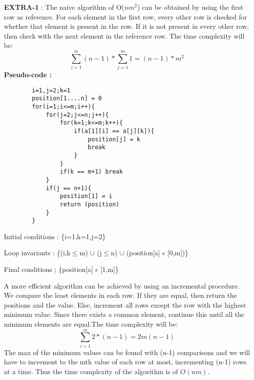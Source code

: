 \documentclass[12pt]{article}
\begin{document}
\begin{enumerate}
    \textbf{EXTRA-1} : 
    The naive algorithm of O($nm^2$) can be obtained by using the first row as reference. For each element in the first row, every other row is checked for whether that element is present in the row. If it is not present in every other row, then check with the next element in the reference row.
    The time complexity will be:
    \[\sum_{i=1}^{m}(n-1)*\sum_{j=1}^{m}1 = (n-1)*m^2 \]
    \textbf{Pseudo-code :}
    \begin{verbatim}
        i=1,j=2;k=1
        position[1....n] = 0
        for(i=1;i<=m;i++){
            for(j=2;j<=n;j++){
                for(k=1;k<=m;k++){
                    if(a[1][i] == a[j][k]){
                        position[j] = k
                        break
                    }
                }
                if(k == m+1) break
            }
            if(j == n+1){
                position[1] = i
                return (position)
            }
        }
    \end{verbatim}
    Initial conditions : \{i=1,k=1,j=2\}
    
    Loop invariants : \{(i,k$\leq$m) $\cup$ (j$\leq$n) $\cup$ (position[a] $\epsilon$ [0,m])\}
    
    Final conditions ; \{position[a] $\epsilon$ [1,m]\}
    
    A more efficient algorithm can be achieved by using an incremental procedure. We compare the least elements in each row. If they are equal, then return the positions and the value. Else, increment all rows except the row with the highest minimum value. Since there exists a common element, continue this until all the minimum elements are equal.The time complexity will be: 
    \[\sum_{i=1}^{m}2*(n-1) = 2m(n-1)\]
    The max of the minimum values can be found with (n-1) comparisons and we will have to increment to the mth value of each row at most, incrementing (n-1) rows at a time. Thus the time complexity of the algorithm is of $O(nm)$.
    

\end{enumerate}
\end{document}
